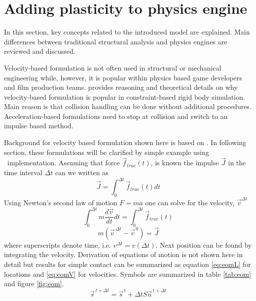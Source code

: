 \section{Adding plasticity to physics engine}

In this section, key concepts related to the introduced model are explained. Main differences between 
traditional structural analysis and physics engines are reviewed and discussed.

Velocity-based formulation is not often used in structural or mechanical engineering while, 
however, it is popular within physics based game developers and film production teams.
 \citet[p.~45]{erleben.thesis} provides reasoning and theoretical details on why 
velocity-based formulation is  popular in constraint-based rigid body simulation. 
Main reason is that collision handling can be done without additional procedures.
Acceleration-based formulations need to stop at collision and switch to an impulse based method.

Background
for velocity based formulation shown here is based on  \citet[p.~45-50]{erleben.thesis}.
In following section, these formulations will be clarified by simple example using \bullet\ implementation.
Assuming that force $\vec{f}_{true}(t)$, is known the impulse $\vec{J}$
in the time interval $\Delta t $ can we written as
\begin{equation} \label{eq:impulseIntegral}
\vec{J} = \int_{0}^{\Delta t} \vec{f}_{true}(t) dt
\end{equation}
Using Newton's second law of motion $F=ma$ one can solve for the velocity, $\vec{v}^{\Delta t}$
\begin{equation} \label{eq:impulseIntegraWithNewton}
\int_{0}^{\Delta t} m \frac{d\vec{v}}{dt}dt= \int_{0}^{\Delta t} \vec{f}_{true}(t)
\end{equation}
\begin{equation} \label{eq:impulse}
m(\vec{v}^{\, \Delta t} - \vec{v}^{\, 0})=\vec{J}
\end{equation}
where superscripts denote time, i.e. ${v}^{\Delta t}=v(\Delta t)$. Next position can be found
by integrating the velocity.
Derivation of equations of motion is not shown here in detail but results 
for simple contact can be summarized as
equation \ref{eq:eomL} for locations and \ref{eq:eomV} for velocities.
Symbols are summarized in table \ref{tab:eom} and figure \ref{fig:eom}.
\begin{equation} \label{eq:eomL} %
\vec{s}^{\, t+\Delta t} = \vec{s}^{\, t}+\Delta t S \vec{u}^{\, t+\Delta t}
\end{equation}

